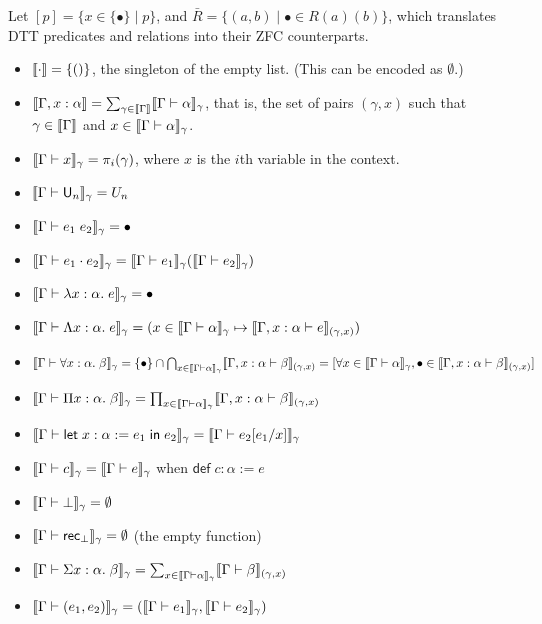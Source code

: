 Let $[p]=\{x\in\{\bullet\}\mid p\}$, and $\bar R=\{(a,b)\mid\bullet\in R(a)(b)\}$, which translates DTT predicates and relations into their ZFC counterparts.
\begin{itemize}
\item $\llbracket \cdot\rrbracket=\{()\}$, the singleton of the empty list. (This can be encoded as $\emptyset$.)
\item $\scott{\Gamma,x:\alpha}=\sum_{\gamma\in\scott{\Gamma}}\scott{\Gamma\vdash\alpha}_\gamma$, that is, the set of pairs $(\gamma,x)$ such that $\gamma\in\scott{\Gamma}$ and $x\in\scott{\Gamma\vdash\alpha}_\gamma$.
\item $\scott{\Gamma\vdash x}_\gamma=\pi_i(\gamma)$, where $x$ is the $i$th variable in the context.
\item $\scott{\Gamma\vdash\U_n}_\gamma=U_n$
\item $\scott{\Gamma\vdash e_1\;e_2}_\gamma=\bullet$
\item $\scott{\Gamma\vdash e_1\cdot e_2}_\gamma=\scott{\Gamma\vdash e_1}_\gamma(\scott{\Gamma\vdash e_2}_\gamma)$
\item $\scott{\Gamma\vdash \lambda x:\alpha.\;e}_\gamma=\bullet$
\item $\scott{\Gamma\vdash \Lambda x:\alpha.\;e}_\gamma=(x\in\scott{\Gamma\vdash \alpha}_\gamma\mapsto\scott{\Gamma,x:\alpha\vdash e}_{(\gamma,x)})$
\item $\scott{\Gamma\vdash \forall x:\alpha.\;\beta}_\gamma=\{\bullet\}\cap\bigcap_{x\in \scott{\Gamma\vdash\alpha}_\gamma}\scott{\Gamma,x:\alpha\vdash\beta}_{(\gamma,x)}=[\forall x\in \scott{\Gamma\vdash\alpha}_\gamma,\bullet\in\scott{\Gamma,x:\alpha\vdash\beta}_{(\gamma,x)}]$
\item $\scott{\Gamma\vdash \Pi x:\alpha.\;\beta}_\gamma=\prod_{x\in \scott{\Gamma\vdash\alpha}_\gamma}\scott{\Gamma,x:\alpha\vdash\beta}_{(\gamma,x)}$ \item $\scott{\Gamma\vdash\elet{x:\alpha:=e_1}{e_2}}_\gamma=\scott{\Gamma\vdash e_2[e_1/x]}_\gamma$
\item $\scott{\Gamma\vdash c}_\gamma=\scott{\Gamma\vdash e}_\gamma$ when $\mathsf{def}\;c:\alpha:=e$
\item $\scott{\Gamma\vdash\bot}_\gamma=\emptyset$
\item $\scott{\Gamma\vdash\rec_\bot}_\gamma=\emptyset$ (the empty function)
\item $\scott{\Gamma\vdash\Sigma x:\alpha.\;\beta}_\gamma=\sum_{x\in \scott{\Gamma\vdash\alpha}_\gamma}\scott{\Gamma\vdash\beta}_{(\gamma,x)}$
\item $\scott{\Gamma\vdash(e_1,e_2)}_\gamma=(\scott{\Gamma\vdash e_1}_\gamma,\scott{\Gamma\vdash e_2}_\gamma)$

\end{itemize}
